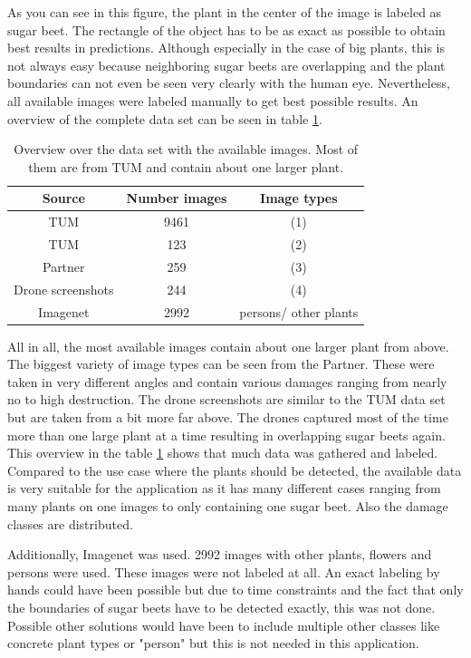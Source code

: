 As you can see in this figure, the plant in the center of the image is labeled as sugar beet. The rectangle of the object has to be as exact as possible to obtain best results in predictions. Although especially in the case of big plants, this is not always easy because neighboring sugar beets are overlapping and the plant boundaries can not even be seen very clearly with the human eye. Nevertheless, all available images were labeled manually to get best possible results. An overview of the complete data set can be seen in table \ref{tab:dataset}.

\begin{table}[h!]
	\centering
	\begin{tabular}{|c c c|} 
		\hline
		Source & Number images & Image types \\ %
		\hline\hline
		TUM & 9461 & (1) \\
		TUM & 123 & (2) \\
		Partner & 259 & (3) \\
		Drone screenshots & 244 & (4) \\
		Imagenet & 2992 & persons/ other plants \\
		\hline
	\end{tabular}
	\caption{Overview over the data set with the available images. Most of them are from TUM and contain about one larger plant.}
	\label{tab:dataset}
\end{table}

All in all, the most available images contain about one larger plant from above. The biggest variety of image types can be seen from the Partner. These were taken in very different angles and contain various damages ranging from nearly no to high destruction. The drone screenshots are similar to the TUM data set but are taken from a bit more far above. The drones captured most of the time more than one large plant at a time resulting in overlapping sugar beets again. This overview in the table \ref{tab:dataset} shows that much data was gathered and labeled. Compared to the use case where the plants should be detected, the available data is very suitable for the application as it has many different cases ranging from many plants on one images to only containing one sugar beet. Also the damage classes are distributed.

Additionally, Imagenet was used. 2992 images with other plants, flowers and persons were used. These images were not labeled at all. An exact labeling by hands could have been possible but due to time constraints and the fact that only the boundaries of sugar beets have to be detected exactly, this was not done. Possible other solutions would have been to include multiple other classes like concrete plant types or "person" but this is not needed in this application.

